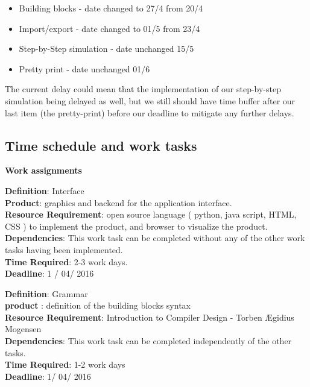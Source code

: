 \documentclass[11pt]{article}
\begin{document}
\begin{itemize}
\item{Building blocks - date changed to 27/4 from 20/4}
\item{Import/export - date changed to 01/5 from 23/4}
\item{Step-by-Step simulation - date unchanged 15/5}
\item{Pretty print - date unchanged 01/6}
\end{itemize}

The current delay could mean that the implementation of our step-by-step simulation being delayed as well, but we still should have time buffer after our last item (the pretty-print) before our deadline to mitigate any further delays.
\newpage

\iffalse

\subsection{Time schedule and work tasks}
\noindent\makebox[\linewidth]{\rule{\paperwidth}{0.4pt}}
\begin{center}\textbf{Work assignments}\end{center}
\noindent\makebox[\linewidth]{\rule{\paperwidth}{0.4pt}}

\noindent\textbf{Definition}: Interface\\
\textbf{Product}: graphics and backend for the application interface.\\
\textbf{Resource Requirement}: open source language ( python, java script, HTML, CSS ) to implement the product, and browser to visualize the product. \\
\textbf{Dependencies}: This work task can be completed without any of the other work tasks having been implemented.\\
\textbf{Time Required}: 2-3 work days.\\
\textbf{Deadline}: 1 / 04/ 2016\\
\noindent\makebox[\linewidth]{\rule{\paperwidth}{0.4pt}}

\noindent\textbf{Definition}:  Grammar \\
\textbf{product} : definition of the building blocks syntax\\
\textbf{Resource Requirement}: Introduction to Compiler Design - Torben Ægidius Mogensen \citep*{mogensen2011introduction}\\
\textbf{Dependencies}: This work task can be completed independently of the other tasks.\\
\textbf{Time Required}: 1-2 work days\\
\textbf{Deadline}: 1/ 04/ 2016\\
\noindent\makebox[\linewidth]{\rule{\paperwidth}{0.4pt}}
\end{document}
